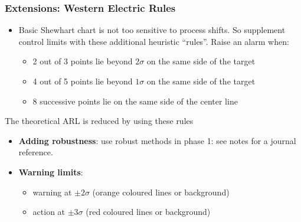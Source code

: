 \begin{frame}\frametitle{Extensions: Western Electric Rules}
	\begin{itemize}
		\item	Basic Shewhart chart is not too sensitive to process shifts. So supplement control limits with these additional heuristic ``rules''. Raise an alarm when:
		\begin{itemize}
			\item	2 out of 3 points lie beyond $2\sigma$ on the same side of the target
			\item	4 out of 5 points lie beyond $1\sigma$ on the same side of the target
			\item	8 successive points lie on the same side of the center line
		\end{itemize}
	\end{itemize}
	
	\vspace{12pt}
	The theoretical ARL is reduced by using these rules
	\begin{itemize}
		\item	\textbf{Adding robustness}: use robust methods in phase 1: see notes for a journal reference.
	\end{itemize}
	
	\vspace{12pt}
	\begin{itemize}
		\item	\textbf{Warning limits}:
		\begin{itemize}
			\item	warning at $\pm 2 \sigma$ (orange coloured lines or background)
			\item	action at $\pm 3\sigma$ (red coloured lines or background)
		\end{itemize}
	\end{itemize}
\end{frame}

